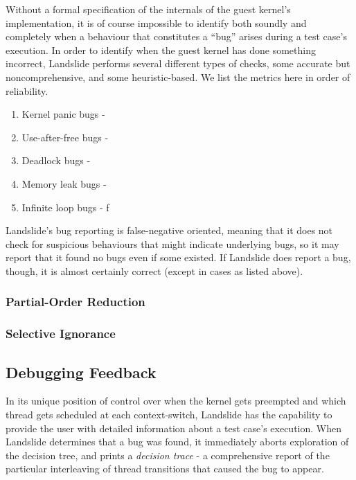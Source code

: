 Without a formal specification of the internals of the guest kernel's implementation, it is of course impossible to identify both soundly and completely when a behaviour that constitutes a ``bug'' arises during a test case's execution.
In order to identify when the guest kernel has done something incorrect, Landslide performs several different types of checks, some accurate but noncomprehensive, and some heuristic-based.
We list the metrics here in order of reliability.
\begin{enumerate}
	\item Kernel panic bugs - 
	\item Use-after-free bugs - 
	\item Deadlock bugs - 
	\item Memory leak bugs - %
	\item Infinite loop bugs - f
\end{enumerate}
Landslide's bug reporting is false-negative oriented, meaning that it does not check for suspicious behaviours that might indicate underlying bugs, so it may report that it found no bugs even if some existed. If Landslide does report a bug, though, it is almost certainly correct (except in cases as listed above).

\subsubsection{Partial-Order Reduction}
\label{sec:techniques-por}

\subsubsection{Selective Ignorance}

\subsection{Debugging Feedback}

In its unique position of control over when the kernel gets preempted and which thread gets scheduled at each context-switch, Landslide has the capability to provide the user with detailed information about a test case's execution.
When Landslide determines that a bug was found, it immediately aborts exploration of the decision tree, and prints a {\em decision trace} - a comprehensive report of the particular interleaving of thread transitions that caused the bug to appear.

